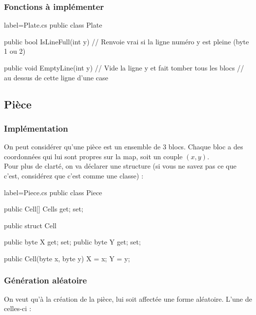 \documentclass[a4paper]{article}
\begin{document}
\subsubsection{Fonctions à implémenter}

\begin{csharpcode*}{label=Plate.cs}
public class Plate
{
    public bool IsLineFull(int y)
    {
        // Renvoie vrai si la ligne numéro y est pleine (byte 1 ou 2)
    }
    
    public void EmptyLine(int y)
    {
        // Vide la ligne y et fait tomber tous les blocs
        // au dessus de cette ligne d'une case
    }
}
\end{csharpcode*}

\subsection{Pièce}

\subsubsection{Implémentation}

On peut considérer qu'une pièce est un ensemble de 3 blocs. Chaque bloc a des
coordonnées qui lui sont propres sur la map, soit un couple $(x,y)$. \\

Pour plus de clarté, on va déclarer une structure (si vous ne savez pas ce que
c'est, considérez que c'est comme une classe) : \\

\begin{csharpcode*}{label=Piece.cs}
public class Piece
{
    public Cell[] Cells { get; set; }

    public struct Cell
    {
        public byte X { get; set; }
        public byte Y { get; set; }

        public Cell(byte x, byte y)
        {
            X = x;
            Y = y;
        }
    }
}
\end{csharpcode*}

\subsubsection{Génération aléatoire}
\begingroup
    On veut qu'à la création de la pièce, lui soit affectée une forme aléatoire.
    L'une de celles-ci : \\
\end{document}
